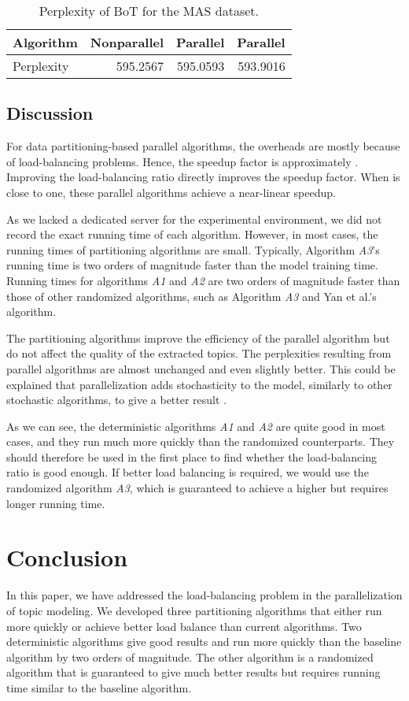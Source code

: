 \documentclass[10pt,conference]{IEEEtran}
\begin{document}
\begin{table}[htbp]
  \centering
  \caption{Perplexity of BoT for the MAS dataset.}
    \begin{tabular}{l|r|r|r}
    \hline
    Algorithm & Nonparallel & Parallel  & Parallel  \\
    \hline
    Perplexity & 595.2567 & 595.0593 & 593.9016 \\
    \hline
    \end{tabular}\label{tab:bot}\end{table}
\subsection{Discussion}
For data partitioning-based parallel algorithms, the overheads are mostly because of load-balancing problems. Hence, the speedup factor is approximately  \cite{yan2009parallel}. Improving the load-balancing ratio  directly improves the speedup factor. When  is close to one, these parallel algorithms achieve a near-linear speedup.

As we lacked a dedicated server for the experimental environment, we did not record the exact running time of each algorithm. However, in most cases, the running times of partitioning algorithms are small. Typically, Algorithm \textit{A3}'s running time is two orders of magnitude faster than the model training time. Running times for algorithms \textit{A1} and \textit{A2} are two orders of magnitude faster than those of other randomized algorithms, such as Algorithm \textit{A3} and Yan et al.'s algorithm.

The partitioning algorithms improve the efficiency of the parallel algorithm but do not affect the quality of the extracted topics. The perplexities resulting from parallel algorithms are almost unchanged and even slightly better. This could be explained that parallelization adds stochasticity to the model, similarly to other stochastic algorithms, to give a better result \cite{ihler2012understanding,recht2011hogwild}.

As we can see, the deterministic algorithms \textit{A1} and \textit{A2} are quite good in most cases, and they run much more quickly than the randomized counterparts. They should therefore be used in the first place to find whether the load-balancing ratio is good enough. If better load balancing is required, we would use the randomized algorithm \textit{A3}, which is guaranteed to achieve a higher  but requires longer running time.
\section{Conclusion}
In this paper, we have addressed the load-balancing problem in the parallelization of topic modeling. We developed three partitioning algorithms that either run more quickly or achieve better load balance than current algorithms. Two deterministic algorithms give good results and run more quickly than the baseline algorithm by two orders of magnitude. The other algorithm is a randomized algorithm that is guaranteed to give much better results but requires running time similar to the baseline algorithm.
\end{document}
